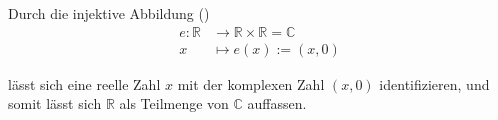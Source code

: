 Durch die injektive Abbildung ()
\begin{align*}
    e : \mathbb{R} & \longrightarrow \mathbb{R} \times \mathbb{R} = \mathbb{C} \\
    x & \longmapsto e(x) := (x, 0)
\end{align*}

lässt sich eine reelle Zahl $x$ mit der komplexen Zahl $(x, 0)$ identifizieren, und somit lässt sich $\mathbb{R}$ als Teilmenge von $\mathbb{C}$ auffassen.
